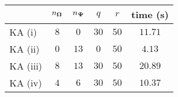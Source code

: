 \centering
\renewcommand{\arraystretch}{1.2}
\begin{tabular}{@{}lccccc@{}}
\toprule
 & $n_{\boldsymbol{\Omega}}$ & $n_{\boldsymbol{\Psi}}$ & $q$ & $r$ & time (s)\\
\midrule
KA (i) & $8$ & $0$ & $30$ & $50$ & $11.71$ \\
KA (ii) & $0$ & $13$ & $0$ & $50$ & $4.13$ \\
KA (iii) & $8$ & $13$ & $30$ & $50$ & $20.89$ \\
KA (iv) & $4$ & $6$ & $30$ & $50$ & $10.37$ \\
\bottomrule
\end{tabular}
